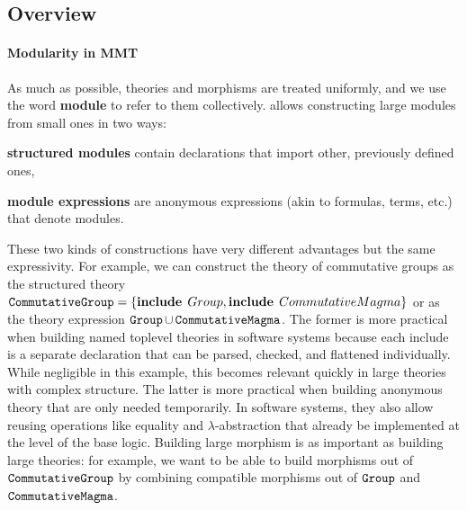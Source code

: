 
\subsection{Overview}

\paragraph{Modularity in MMT}
As much as possible, theories and morphisms are treated uniformly, and we use the word \textbf{module} to refer to them collectively.
\mmt allows constructing large modules from small ones in two ways:
\begin{compactitem}
  \item \textbf{structured modules} contain declarations that import other, previously defined ones,
  \item \textbf{module expressions} are anonymous expressions (akin to formulas, terms, etc.) that denote modules.
\end{compactitem}

These two kinds of constructions have very different advantages but the same expressivity.
For example, we can construct the theory of commutative groups as the structured theory $\operatorname{\mathtt{CommutativeGroup}}=\{\operatorname{\mathbf{include}}{\;Group},\operatorname{\mathbf{include}}{\;CommutativeMagma}\}$ or as the theory expression $\operatorname{\mathtt{Group}}\cup\operatorname{\mathtt{CommutativeMagma}}$.
The former is more practical when building named toplevel theories in software systems because each include is a separate declaration that can be parsed, checked, and flattened individually.
While negligible in this example, this becomes relevant quickly in large theories with complex structure.
The latter is more practical when building anonymous theory that are only needed temporarily.
In software systems, they also allow reusing operations like equality and $\lambda$-abstraction that already be implemented at the level of the base logic.
Building large morphism is as important as building large theories: for example, we want to be able to build morphisms out of $\operatorname{\mathtt{CommutativeGroup}}$ by combining compatible morphisms out of $\operatorname{\mathtt{Group}}$ and $\operatorname{\mathtt{CommutativeMagma}}$.

